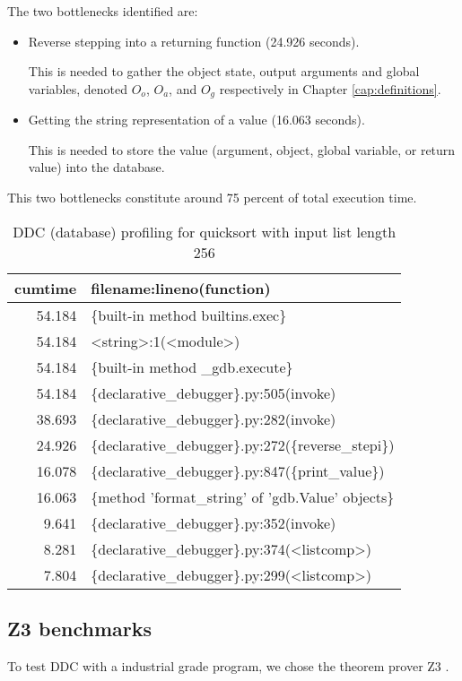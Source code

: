 The two bottlenecks identified are:
\begin{itemize}
    \item Reverse stepping into a returning function (24.926 seconds).
    
    This is needed to gather the object state, output arguments and global variables, denoted \(O_o\), \(O_a\), and \(O_g\) respectively in Chapter \ref{cap:definitions}.
    
    \item Getting the string representation of a value (16.063 seconds).
    
    This is needed to store the value (argument, object, global variable, or return value) into the database.
\end{itemize}
This two bottlenecks constitute around 75 percent of total execution time.
 
\begin{table}
\caption{DDC (database) profiling for quicksort with input list length 256}
\label{table:DDC_profile}
\begin{tabular}{rl}
cumtime & filename:lineno(function)\\
\hline
54.184 & \{built-in method builtins.exec\}\\
54.184 & <string>:1(<module>)\\
54.184 & \{built-in method \_gdb.execute\}\\
54.184 & \{declarative\_debugger\}.py:505(invoke)\\
38.693 & \{declarative\_debugger\}.py:282(invoke)\\
24.926 & \{declarative\_debugger\}.py:272(\{reverse\_stepi\})\\
16.078 & \{declarative\_debugger\}.py:847(\{print\_value\})\\
16.063 & \{method 'format\_string'  of 'gdb.Value'  objects\}\\
9.641 & \{declarative\_debugger\}.py:352(invoke)\\
8.281 & \{declarative\_debugger\}.py:374(<listcomp>)\\
7.804 & \{declarative\_debugger\}.py:299(<listcomp>)\\
\end{tabular}
\end{table}

\subsection{Z3 benchmarks}
To test DDC with a industrial grade program, we chose the theorem prover Z3 \cite{z3}.

